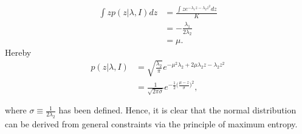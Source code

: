 \begin{example}
	\begin{equation}
		\begin{split}
			\int zp(z|\lambda,I) dz &= \frac{\int ze^{-\lambda_1z-\lambda_2z^2}dz}{K}\\
			&= -\frac{\lambda_1}{2\lambda_2}\\
			&=\mu.
		\end{split}
	\end{equation}
	Hereby
	\begin{equation}
		\begin{split}
			p(z|\lambda,I) &= \sqrt{\frac{\lambda_2}{\pi}}e^{-\mu^2\lambda_2+2\mu \lambda_2z-\lambda_2z^2}\\
			&= \frac{1}{\sqrt{2\pi\sigma}}e^{-\frac{1}{2}\big(\frac{\mu-z}{\sigma}\big)^2},\\\\
		\end{split}
	\end{equation}
	where $\sigma\equiv \frac{1}{2\lambda_2}$ has been defined. Hence, it is clear that the normal distribution can be derived from general constraints via the principle of maximum entropy.
\end{example}

